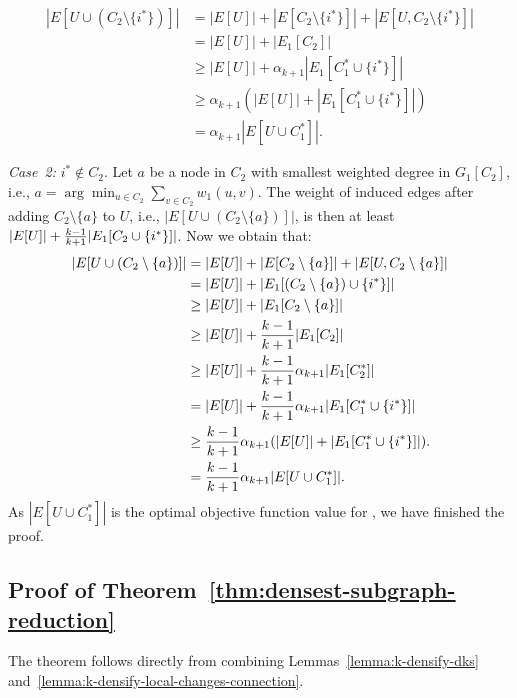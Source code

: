\begin{equation}
    \begin{aligned}
        |E[U \cup (C_2 \setminus \{i^*\})]| &= |E[U]| + |E[C_2 \setminus \{i^*\}]| + |E[U, C_2 \setminus \{i^*\}]| \\
		&= |E[U]| + | E_1[C_2]| \\
		&\geq |E[U]| + \alpha_{k+1}|E_1[C_1^* \cup \{i^*\}]| \\
		&\geq \alpha_{k+1} (|E[U]| + |E_1[C_1^* \cup \{i^*\}]|) \\
		&= \alpha_{k+1} |E[U \cup C_1^*]|. 
    \end{aligned}
\end{equation}

\emph{Case~2:} $i^* \notin C_2$. 
Let $a$ be a node in $C_2$ with smallest weighted degree in $G_1[C_2]$, i.e., $a = \arg\min_{u \in C_2} \sum_{v \in C_2}w_1(u, v)$.
The weight of induced edges after adding $C_2 \setminus \{a\}$ to $U$, i.e.,
$|E[U \cup (C_2 \setminus \{a\})]|$, is then at least
$|E[U]| + \frac{k-1}{k+1}\lvert E_1[C_2 \cup \{i^*\}]\rvert$. 
Now we obtain that:
\begin{equation}
    \begin{aligned}
		|E[U \cup (C_2 \setminus \{a\})]|&=|E[U]| + |E[C_2 \setminus \{a\}]| + |E[U, C_2 \setminus \{a\}]| \\
		&= |E[U]| + |E_1[(C_2 \setminus \{a\}) \cup \{i^*\}]| \\
        &\geq |E[U]| + \lvert E_1[C_2 \setminus \{a\}]\rvert \\
		&\geq |E[U]| + \frac{k-1}{k+1}\lvert E_1[C_2]\rvert \\
		&\geq  |E[U]| + \frac{k-1}{k+1} \alpha_{k+1}\lvert E_1[C_2^*]\rvert \\
        &= |E[U]| + \frac{k-1}{k+1} \alpha_{k+1}\lvert E_1[C_1^* \cup \{i^*\}]\rvert \\
		&\geq \frac{k-1}{k+1} \alpha_{k+1} (|E[U]| + \lvert E_1[C_1^* \cup \{i^*\}]\rvert).\\
		&= \frac{k-1}{k+1} \alpha_{k+1} \lvert E[U \cup C_1^*]\rvert.
    \end{aligned}
\end{equation}
As $|E[U\cup C_1^*]|$ is the optimal objective function value for \kdense, we
have finished the proof. 

\subsection{Proof of Theorem~\ref{thm:densest-subgraph-reduction}}
\label{proof:densest-subgraph-reduction}

The theorem follows directly from combining Lemmas~\ref{lemma:k-densify-dks}
and~\ref{lemma:k-densify-local-changes-connection}.
